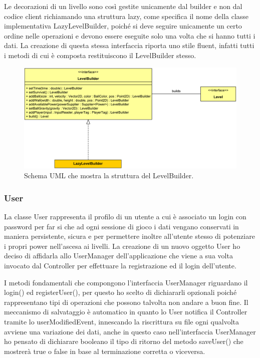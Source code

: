 \documentclass[a4paper,12pt]{report}
\begin{document}
Le decorazioni di un livello sono così gestite unicamente dal builder e non dal codice client richiamando una struttura lazy, come specifica il nome della classe implementativa LazyLevelBuilder, poiché si deve seguire unicamente un certo ordine nelle operazioni e devono essere eseguite solo una volta che si hanno tutti i dati. 
La creazione di questa stessa interfaccia riporta uno stile fluent, infatti tutti i metodi di cui è composta restituiscono il LevelBuilder stesso.

\begin{figure}[H]
\includegraphics[width=\linewidth]{img/levelbuilder}
\caption{Schema UML che mostra la struttura del LevelBuilder.}
\label{img:builder}
\end{figure}

\subsubsection*{User}
La classe User rappresenta il profilo di un utente a cui è associato un login con password per far si che ad ogni sessione di gioco i dati vengano conservati in maniera persistente, sicura e per permettere inoltre all'utente stesso di potenziare i propri power nell'ascesa ai livelli.
La creazione di un nuovo oggetto User ho deciso di affidarla allo UserManager dell'applicazione che viene a sua volta invocato dal Controller per effettuare la registrazione ed il login dell'utente.

I metodi fondamentali che compongono l'interfaccia UserManager riguardano il login() ed registerUser(), per questo ho scelto di dichiararli opzionali poiché rappresentano tipi di operazioni che possono talvolta non andare a buon fine. 
Il meccanismo di salvataggio è automatico in quanto lo User notifica il Controller tramite lo userModifiedEvent, innescando la riscrittura su file ogni qualvolta avviene una variazione dei dati, anche in questo caso nell'interfaccia UserManager ho pensato di dichiarare booleano il tipo di ritorno del metodo saveUser() che mostrerà true o false in base al terminazione corretta o viceversa.
\end{document}
